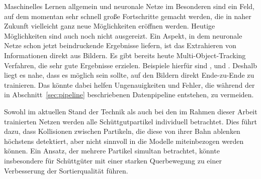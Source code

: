 Maschinelles Lernen allgemein und neuronale Netze im Besonderen sind ein Feld, auf dem momentan sehr schnell große Fortschritte gemacht werden,
die in naher Zukunft vielleicht ganz neue Möglichkeiten eröffnen werden.
Heutige Möglichkeiten sind auch noch nicht ausgereizt.
Ein Aspekt, in dem neuronale Netze schon jetzt beindruckende Ergebnisse liefern, ist das Extrahieren von Informationen direkt aus Bildern.
Es gibt bereits heute Multi-Object-Tracking Verfahren, die sehr gute Ergebnisse erzielen. 
Beispiele hierfür sind \cite{Milan2017}, \cite{son2017multi} und \cite{ning2017spatially}.
Deshalb liegt es nahe, dass es möglich sein sollte, auf den Bildern direkt Ende-zu-Ende zu trainieren.
Das könnte dabei helfen Ungenauigkeiten und Fehler, die während der in Abschnitt~\ref{sec:pipeline} beschriebenen Datenpipeline entstehen, zu vermeiden.

Sowohl im aktuellen Stand der Technik als auch bei den im Rahmen dieser Arbeit trainierten Netzen werden alle Schüttgutpartikel individuell betrachtet.
Dies führt dazu, dass Kollisionen zwischen Partikeln, die diese von ihrer Bahn ablenken höchstens detektiert, aber nicht sinnvoll in die Modelle miteinbezogen werden können.
Ein Ansatz, der mehrere Partikel simultan betrachtet, könnte insbesondere für Schüttgüter mit einer starken Querbewegung zu einer Verbesserung der Sortierqualität führen.


